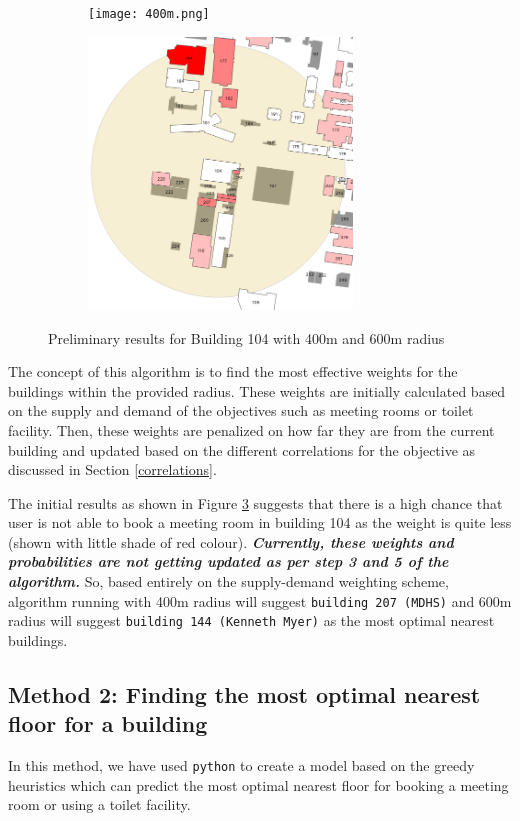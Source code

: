 \begin{figure}[H]
\centering
\begin{subfigure}{.5\textwidth}
  \centering
  \texttt{[image: 400m.png]}
  \label{fig:400}
\end{subfigure}%
\begin{subfigure}{.5\textwidth}
  \centering
  \includegraphics[width=7cm]{resources/images/600m.png}
  \label{fig:600}
\end{subfigure}
\caption{Preliminary results for Building 104 with 400m and 600m radius}
\label{fig:400-600}
\end{figure}

The concept of this algorithm is to find the most effective weights for the buildings within the provided radius. These weights are initially calculated based on the supply and demand of the objectives such as meeting rooms or toilet facility. Then, these weights are penalized on how far they are from the current building and updated based on the different correlations for the objective as discussed in Section \ref{correlations}. 

The initial results as shown in Figure \ref{fig:400-600} suggests that there is a high chance that user is not able to book a meeting room in building 104 as the weight is quite less (shown with little shade of red colour). \textbf{\textit{Currently, these weights and probabilities are not getting updated as per step 3 and 5 of the algorithm.}} So, based entirely on the supply-demand weighting scheme, algorithm running with 400m radius will suggest \texttt{building 207 (MDHS)} and 600m radius will suggest \texttt{building 144 (Kenneth Myer)} as the most optimal nearest buildings.

\subsection{Method 2: Finding the most optimal nearest floor for a building}
In this method, we have used \texttt{python} to create a model based on the greedy heuristics which can predict the most optimal nearest floor for booking a meeting room or using a toilet facility. 

